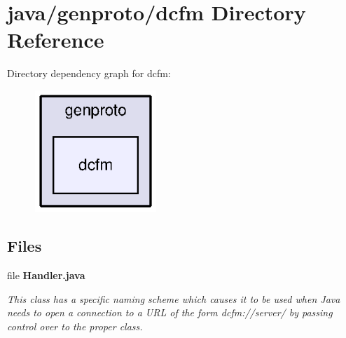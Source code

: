\section{java/genproto/dcfm Directory Reference}
\label{dir_625eb7975d706d6838cdaf30eed55f4a}
Directory dependency graph for dcfm\+:\nopagebreak
\begin{figure}[H]
\begin{center}
\leavevmode
\includegraphics[width=130pt]{dir_625eb7975d706d6838cdaf30eed55f4a_dep}
\end{center}
\end{figure}
\subsection*{Files}
\begin{DoxyCompactItemize}
\item 
file {\bf Handler.\+java}
\begin{DoxyCompactList}\small\item\em This class has a specific naming scheme which causes it to be used when Java needs to open a connection to a U\+R\+L of the form dcfm\+://server/ by passing control over to the proper class. \end{DoxyCompactList}\end{DoxyCompactItemize}
